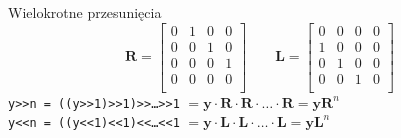 \documentclass{mp}
\renewcommand{\vec}[1]{\mathbf{#1}}
\begin{document}
\begin{frame}{Wielokrotne przesunięcia}
$$
\vec{R} = \begin{bmatrix} 
0 & 1 & 0 & 0 \\
0 & 0 & 1 & 0 \\
0 & 0 & 0 & 1 \\
0 & 0 & 0 & 0 \\
\end{bmatrix} 
\qquad
\vec{L} = \begin{bmatrix} 
0 & 0 & 0 & 0 \\
1 & 0 & 0 & 0 \\
0 & 1 & 0 & 0 \\
0 & 0 & 1 & 0 \\
\end{bmatrix}
$$
\only<2->{$$\vec{R}=\vec{L}^T$$}
{
\texttt{y>>n = ((y>>1)>>1)>>\ldots>>1} $=\vec{y}\cdot \vec{R}\cdot \vec{R}\cdot\ldots\cdot \vec{R}=\vec{y}\vec{R}^n$ \\
\texttt{y<<n = ((y<<1)<<1)<<\ldots<<1} $=\vec{y}\cdot \vec{L}\cdot \vec{L}\cdot\ldots\cdot \vec{L}=\vec{y}\vec{L}^n$ \\
}
\end{frame}
\end{document}
